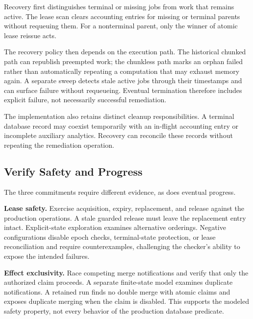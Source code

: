 Recovery first distinguishes terminal or missing jobs from work that remains active. The lease scan clears accounting entries for missing or terminal parents without requeuing them. For a nonterminal parent, only the winner of atomic lease reissue acts.

The recovery policy then depends on the execution path. The historical chunked path can republish preempted work; the chunkless path marks an orphan failed rather than automatically repeating a computation that may exhaust memory again. A separate sweep detects stale active jobs through their timestamps and can surface failure without requeueing. Eventual termination therefore includes explicit failure, not necessarily successful remediation.

The implementation also retains distinct cleanup responsibilities. A terminal database record may coexist temporarily with an in-flight accounting entry or incomplete auxiliary analytics. Recovery can reconcile these records without repeating the remediation operation.

\subsection*{Verify Safety and Progress}

The three commitments require different evidence, as does eventual progress.


\textbf{Lease safety.} Exercise acquisition, expiry, replacement, and release against the production operations. A stale guarded release must leave the replacement entry intact. Explicit-state exploration examines alternative orderings. Negative configurations disable epoch checks, terminal-state protection, or lease reconciliation and require counterexamples, challenging the checker's ability to expose the intended failures.



\textbf{Effect exclusivity.} Race competing merge notifications and verify that only the authorized claim proceeds. A separate finite-state model examines duplicate notifications. A retained run finds no double merge with atomic claims and exposes duplicate merging when the claim is disabled. This supports the modeled safety property, not every behavior of the production database predicate.

